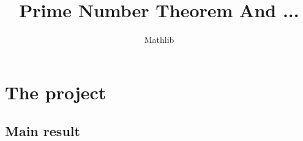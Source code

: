 \documentclass{report}
\title{Prime Number Theorem And ...}
\author{Mathlib}
\theoremstyle{definition}
\begin{document}
\maketitle

\chapter{The project}

\section{Main result}




\end{document}
